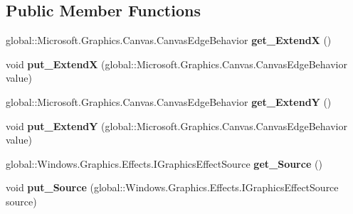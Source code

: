 \subsection*{Public Member Functions}
\begin{DoxyCompactItemize}
\item 
\mbox{\label{interface_microsoft_1_1_graphics_1_1_canvas_1_1_effects_1_1_i_border_effect_a3ffc4033dcf6efc380e3123b9b5c0705}} 
global\+::\+Microsoft.\+Graphics.\+Canvas.\+Canvas\+Edge\+Behavior {\bfseries get\+\_\+\+ExtendX} ()
\item 
\mbox{\label{interface_microsoft_1_1_graphics_1_1_canvas_1_1_effects_1_1_i_border_effect_a3d2ad4061338958f9b6396932807d34e}} 
void {\bfseries put\+\_\+\+ExtendX} (global\+::\+Microsoft.\+Graphics.\+Canvas.\+Canvas\+Edge\+Behavior value)
\item 
\mbox{\label{interface_microsoft_1_1_graphics_1_1_canvas_1_1_effects_1_1_i_border_effect_a7a0f2391a20f1cfa52255948727851d6}} 
global\+::\+Microsoft.\+Graphics.\+Canvas.\+Canvas\+Edge\+Behavior {\bfseries get\+\_\+\+ExtendY} ()
\item 
\mbox{\label{interface_microsoft_1_1_graphics_1_1_canvas_1_1_effects_1_1_i_border_effect_a372972f65ae9a42601613acb61241a6d}} 
void {\bfseries put\+\_\+\+ExtendY} (global\+::\+Microsoft.\+Graphics.\+Canvas.\+Canvas\+Edge\+Behavior value)
\item 
\mbox{\label{interface_microsoft_1_1_graphics_1_1_canvas_1_1_effects_1_1_i_border_effect_a2455f124b6e073f2b70aa6c68d5bc616}} 
global\+::\+Windows.\+Graphics.\+Effects.\+I\+Graphics\+Effect\+Source {\bfseries get\+\_\+\+Source} ()
\item 
\mbox{\label{interface_microsoft_1_1_graphics_1_1_canvas_1_1_effects_1_1_i_border_effect_a7d1e465d73b86e93f93e8df97f29f492}} 
void {\bfseries put\+\_\+\+Source} (global\+::\+Windows.\+Graphics.\+Effects.\+I\+Graphics\+Effect\+Source source)

\end{DoxyCompactItemize}

